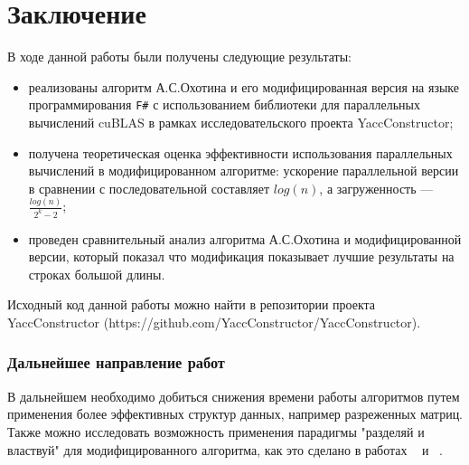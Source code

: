 \documentclass[14pt]{matmex-diploma}
\begin{document}
\section{Заключение}
В ходе данной работы были получены следующие результаты: 

\begin{itemize}
\item реализованы алгоритм А.С.Охотина и его модифицированная версия на языке программирования \texttt{F\#} с использованием библиотеки для параллельных вычислений cuBLAS в рамках исследовательского проекта YaccConstructor;
\item получена теоретическая оценка эффективности использования параллельных вычислений в модифицированном алгоритме: ускорение параллельной версии в сравнении с последовательной составляет $log(n)$, а загруженность --- $\frac{log(n)}{2^k - 2}$;
\item проведен сравнительный анализ алгоритма А.С.Охотина и модифицированной версии, который показал что модификация показывает лучшие результаты на строках большой длины.
\end{itemize}

Исходный код данной работы можно найти в репозитории проекта YaccConstructor (https://github.com/YaccConstructor/YaccConstructor).

\subsubsection*{Дальнейшее направление работ}

В дальнейшем необходимо добиться снижения времени работы алгоритмов путем применения более эффективных структур данных, например разреженных матриц. Также можно исследовать возможность применения парадигмы "разделяй и властвуй" для модифицированного алгоритма, как это сделано в работах ~\cite{divide} и ~\cite{tobias}.



\setmonofont[Mapping=tex-text]{CMU Typewriter Text}


\end{document}
